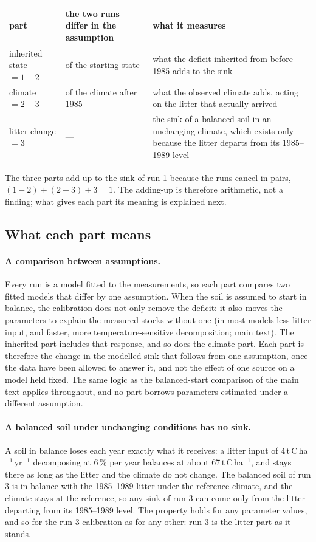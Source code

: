 \documentclass[../HIKET_draft_v1.tex]{subfiles}
\begin{document}
\begin{center}
\small
\begin{tabular}{lp{5.3cm}p{5.0cm}}
\hline
part & the two runs differ in the assumption & what it measures \\
\hline
inherited state $= 1-2$ & of the starting state & what the deficit inherited from before 1985 adds to the sink \\
climate $= 2-3$ & of the climate after 1985 & what the observed climate adds, acting on the litter that actually arrived \\
litter change $= 3$ & --- & the sink of a balanced soil in an unchanging climate, which exists only because the litter departs from its 1985--1989 level \\
\hline
\end{tabular}
\end{center}

The three parts add up to the sink of run 1 because the runs cancel in pairs,
$(1-2) + (2-3) + 3 = 1$. The adding-up is therefore arithmetic, not a finding; what gives
each part its meaning is explained next.

\subsection{What each part means}

\paragraph{A comparison between assumptions.} Every run is a model fitted to the
measurements, so each part compares two fitted models that differ by one assumption. When
the soil is assumed to start in balance, the calibration does not only remove the deficit:
it also moves the parameters to explain the measured stocks without one (in most models
less litter input, and faster, more temperature-sensitive decomposition; main text). The
inherited part includes that response, and so does the climate part. Each part is therefore
the change in the modelled sink that follows from one assumption, once the data have been
allowed to answer it, and not the effect of one source on a model held fixed. The same
logic as the balanced-start comparison of the main text applies throughout, and no part
borrows parameters estimated under a different assumption.

\paragraph{A balanced soil under unchanging conditions has no sink.} A soil in balance
loses each year exactly what it receives: a litter input of 4\,t\,C\,ha$^{-1}$\,yr$^{-1}$
decomposing at 6\,\% per year balances at about 67\,t\,C\,ha$^{-1}$, and stays there as long
as the litter and the climate do not change. The balanced soil of run 3 is in balance with
the 1985--1989 litter under the reference climate, and the climate stays at the reference,
so any sink of run 3 can come only from the litter departing from its 1985--1989 level.
The property holds for any parameter values, and so for the run-3 calibration as for any
other: run 3 is the litter part as it stands.
\end{document}
